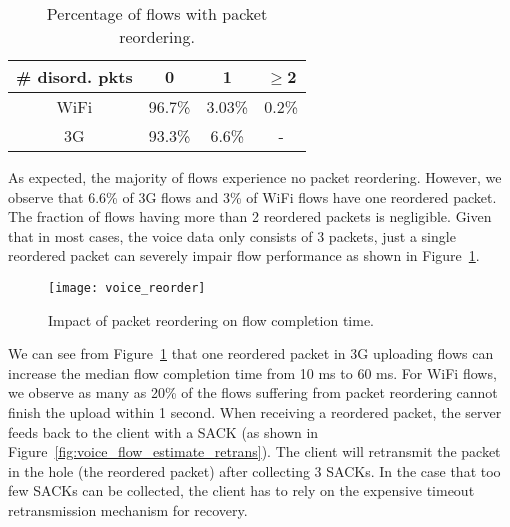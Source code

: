 
\begin{table}[th]
\caption{Percentage of flows with packet reordering.}
\label{tab:voice_reorder}
\centering
\renewcommand{\arraystretch}{1.0}
\begin{tabular}{c|c|c|c}
	\hline
	\# disord. pkts & 0 & 1 & $\ge$2 \\
	\hline
	WiFi & 96.7\% & 3.03\% & 0.2\% \\
	\hline
	3G & 93.3\% & 6.6\% & - \\
	\hline
\end{tabular}
\end{table}

As expected, the majority of flows experience no packet reordering. However, we observe that 6.6\% of 3G flows and 3\% of WiFi flows have one reordered packet. The fraction of flows having more than 2 reordered packets is negligible. Given that in most cases, the voice data only consists of 3 packets, just a single reordered packet can severely impair flow performance as shown in Figure~\ref{fig:voice_reorder}.

\begin{figure}[th]
\centering
	\texttt{[image: voice\_reorder]}
\caption{Impact of packet reordering on flow completion time.}
\label{fig:voice_reorder}
\end{figure}

We can see from Figure~\ref{fig:voice_reorder} that one reordered packet in 3G uploading flows can increase the median flow completion time from 10 ms to 60 ms. For WiFi flows, we observe as many as 20\% of the flows suffering from packet reordering cannot finish the upload within 1 second. When receiving a reordered packet, the server feeds back to the client with a SACK (as shown in Figure~\ref{fig:voice_flow_estimate_retrans}). The client will retransmit the packet in the hole (\ie the reordered packet) after collecting 3 SACKs. In the case that too few SACKs can be collected, the client has to rely on the expensive timeout retransmission mechanism for recovery. %


